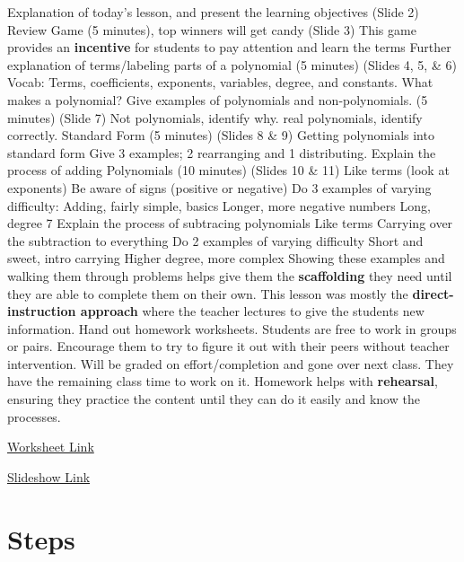 \begin{outline}
    \1 Explanation of today’s lesson, and present the learning objectives (Slide 2)
    \1 Review Game (5 minutes), top winners will get candy (Slide 3)
        \2 This game provides an \textbf{incentive} for students to pay attention and learn the terms
    \1 Further explanation of terms/labeling parts of a polynomial (5 minutes) (Slides 4, 5, \& 6)
        \2 Vocab: Terms, coefficients, exponents, variables, degree, and constants.
        \2 What makes a polynomial?
    \1 Give examples of polynomials and non-polynomials. (5 minutes) (Slide 7)
         Not polynomials, identify why.
         real polynomials, identify correctly.
    \1 Standard Form (5 minutes) (Slides 8 \& 9)
        \2 Getting polynomials into standard form 
            \3 Give 3 examples; 2 rearranging and 1 distributing.
    \1 Explain the process of adding Polynomials (10 minutes) (Slides 10 \& 11)
        \2 Like terms (look at exponents)
        \2 Be aware of signs (positive or negative)
        \2 Do 3 examples of varying difficulty:
            \3 Adding, fairly simple, basics
            \3 Longer, more negative numbers
            \3 Long, degree 7
    \1 Explain the process of subtracing polynomials
        \2 Like terms
        \2 Carrying over the subtraction to everything
        \2 Do 2 examples of varying difficulty
            \3 Short and sweet, intro carrying
            \3 Higher degree, more complex
        \2 Showing these examples and walking them through problems helps give them the \textbf{scaffolding} they need until they are able to complete them on their own.
            \3 This lesson was mostly the \textbf{direct-instruction approach} where the teacher lectures to give the students new information.
    \1 Hand out homework worksheets. Students are free to work in groups or pairs. Encourage them to try to figure it out with their peers without teacher intervention. Will be graded on effort/completion and gone over next class. They have the remaining class time to work on it.
        \2 Homework helps with \textbf{rehearsal}, ensuring they practice the content until they can do it easily and know the processes.
\end{outline}

\href{link}{Worksheet Link}

\href{https://www.canva.com/design/DAF0A7UZXcA/X2H6gbI5I4nYcRe6sKrcHQ/edit?utm_content=DAF0A7UZXcA&utm_campaign=designshare&utm_medium=link2&utm_source=sharebutton}{Slideshow Link}

\section{Steps}

